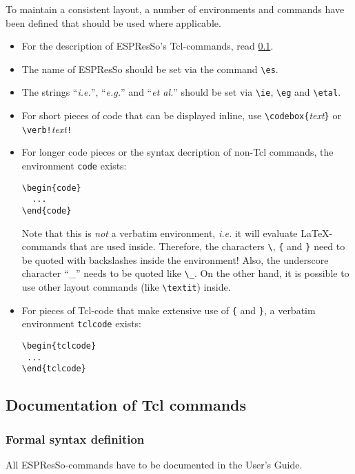 \documentclass[
a4paper,                        %
11pt,                           %
twoside,                        %
footsepline,                    %
headsepline,                    %
headexclude,                    %
footexclude,                    %
pagesize,                       %
bibtotocnumbered,               %
idxtotoc                        %
]{scrreprt}
\newcommand{\es}{\mbox{\textsf{ESPResSo}}\xspace}
\newcommand{\ie}{\textit{i.e.}\xspace}
\newcommand{\eg}{\textit{e.g.}\xspace}
\newcommand{\etal}{\textit{et al.}\xspace}
\begin{document}
To maintain a consistent layout, a number of environments and
commands have been defined that should be used where applicable. 
\begin{itemize}
\item For the description of \es's Tcl-commands, read \ref{tcl_docs}.
\item The name of \es should be set via the command \verb!\es!.
\item The strings ``\ie'', ``\eg'' and ``\etal'' should be set via
  \verb!\ie!, \verb!\eg! and \verb!\etal!.
\item For short pieces of code that can be displayed inline, use
  \verb!\codebox{!\textit{text}\verb!}! or \verb|\verb!|\textit{text}\verb|!|
\item For longer code pieces or the syntax decription of non-Tcl
  commands, the environment \texttt{code} exists:
\begin{verbatim}
\begin{code}
  ...
\end{code}
\end{verbatim}
  Note that this is \emph{not} a verbatim environment, \ie it will
  evaluate \LaTeX-commands that are used inside. Therefore, the
  characters \verb!\!, \verb!{! and \verb!}! need to be quoted with
  backslashes inside the environment!  Also, the underscore character
  ``\_'' needs to be quoted like \verb!\_!. On the other hand, it is
  possible to use other layout commands (like \verb!\textit!) inside.
\item For pieces of Tcl-code that make extensive use of \verb!{! and
    \verb!}!, a verbatim environment \verb!tclcode! exists: 
\begin{verbatim}
\begin{tclcode}
 ...
\end{tclcode}
\end{verbatim}
\end{itemize}

\subsection{Documentation of Tcl commands}
\label{tcl_docs}

\subsubsection{Formal syntax definition}

All \es-commands have to be documented in the User's Guide.
\end{document}
